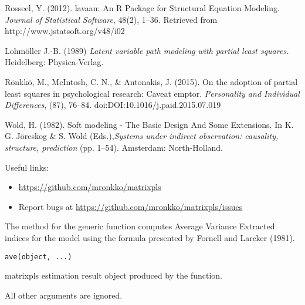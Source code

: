 \documentclass[a4paper]{book}
\begin{document}
%
\begin{References}\relax
Rosseel, Y. (2012). lavaan: An R Package for Structural Equation Modeling. \emph{Journal of Statistical Software}, 48(2), 1–36. Retrieved from http://www.jstatsoft.org/v48/i02

Lohmöller J.-B. (1989) \emph{Latent variable path modeling with partial least squares.} Heidelberg: Physica-Verlag.

Rönkkö, M., McIntosh, C. N., \& Antonakis, J. (2015). On the adoption of partial
least squares in psychological research: Caveat emptor. 
\emph{Personality and Individual Differences}, (87), 76–84. 
doi:\nobreakspace{}DOI:10.1016/j.paid.2015.07.019

Wold, H. (1982). Soft modeling - The Basic Design And Some Extensions. 
In K. G. Jöreskog \& S. Wold (Eds.),\emph{Systems under indirect observation:
causality, structure, prediction} (pp. 1–54). Amsterdam: North-Holland.
\end{References}
%
\begin{SeeAlso}\relax
Useful links:
\begin{itemize}

\item{} \url{https://github.com/mronkko/matrixpls}
\item{} Report bugs at \url{https://github.com/mronkko/matrixpls/issues}

\end{itemize}


\end{SeeAlso}
%
\begin{Description}\relax
The  method for the generic function  computes Average Variance Extracted 
indices for the model using the formula presented by Fornell and Larcker (1981).
\end{Description}
%
\begin{Usage}
\begin{verbatim}
ave(object, ...)
\end{verbatim}
\end{Usage}
%
\begin{Arguments}
\begin{ldescription}
\item[\code{object}] matrixpls estimation result object produced by the  function.

\item[\code{...}] All other arguments are ignored.
\end{ldescription}
\end{Arguments}
\end{document}
